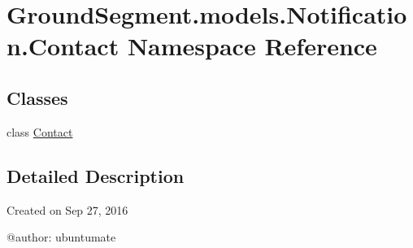 \hypertarget{namespace_ground_segment_1_1models_1_1_notification_1_1_contact}{}\section{Ground\+Segment.\+models.\+Notification.\+Contact Namespace Reference}
\label{namespace_ground_segment_1_1models_1_1_notification_1_1_contact}
\subsection*{Classes}
\begin{DoxyCompactItemize}
\item 
class \hyperlink{class_ground_segment_1_1models_1_1_notification_1_1_contact_1_1_contact}{Contact}
\end{DoxyCompactItemize}


\subsection{Detailed Description}
\begin{DoxyVerb}Created on Sep 27, 2016

@author: ubuntumate
\end{DoxyVerb}
 